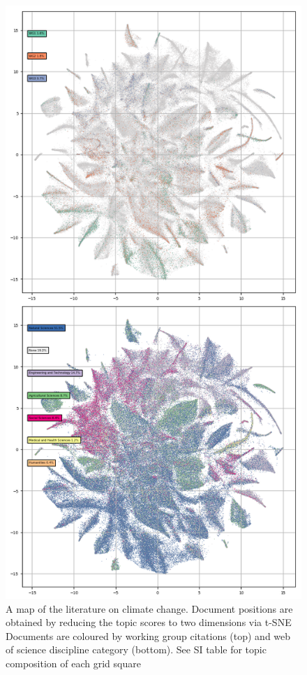 \documentclass{article}
\begin{document}
\begin{figure}[h]
	\begin{center}
		\includegraphics[width=0.85\linewidth]{tsne_results/plots/run_1275_s_0_p100_double.png}
		\caption{A map of the literature on climate change. Document positions are obtained by reducing the topic scores to two dimensions via t-SNE Documents are coloured by working group citations (top) and web of science discipline category (bottom). See SI table for topic composition of each grid square}
		\label{map-double}
	\end{center}
\end{figure}
\end{document}
